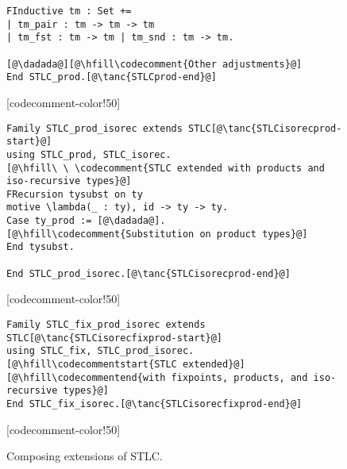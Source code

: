 \begin{figure}
\begin{minipage}{\textwidth}
\begin{multicols}{2}
\begin{lstlisting}
FInductive tm : Set +=
| tm_pair : tm -> tm -> tm
| tm_fst : tm -> tm | tm_snd : tm -> tm.

[@\dadada@][@\hfill\codecomment{Other adjustments}@]
End STLC_prod.[@\tanc{STLCprod-end}@]
\end{lstlisting}

[codecomment-color!50]

\vspace{-10pt}


\begin{lstlisting}
Family STLC_prod_isorec extends STLC[@\tanc{STLCisorecprod-start}@]
using STLC_prod, STLC_isorec.
[@\hfill\ \ \codecomment{STLC extended with products and iso-recursive types}@]
FRecursion tysubst on ty
motive \lambda(_ : ty), id -> ty -> ty.
Case ty_prod := [@\dadada@].[@\hfill\codecomment{Substitution on product types}@]
End tysubst.

End STLC_prod_isorec.[@\tanc{STLCisorecprod-end}@]
\end{lstlisting}

[codecomment-color!50]

\vspace{-10pt}


\begin{lstlisting}
Family STLC_fix_prod_isorec extends STLC[@\tanc{STLCisorecfixprod-start}@]
using STLC_fix, STLC_prod_isorec.[@\hfill\codecommentstart{STLC extended}@]
[@\hfill\codecommentend{with fixpoints, products, and iso-recursive types}@]
End STLC_fix_isorec.[@\tanc{STLCisorecfixprod-end}@]
\end{lstlisting}

[codecomment-color!50]

\end{multicols}
\end{minipage}

\caption{Composing extensions of STLC.}
\label{fig:stlc-isorec-prod}
\end{figure}